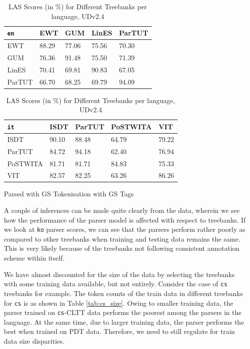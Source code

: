 \begin{table}[H]
    \begin{tabular}{|l|l|l|l|l|}
    \hline
    \verb|en| & EWT & GUM & LinES & ParTUT \\
    \hline
    EWT & 88.29 & 77.06 & 75.56 & 70.30 \\
    \hline
    GUM & 76.36 & 91.48 & 75.50 & 71.39 \\
    \hline
    LinES & 70.41 & 69.81 & 90.83 & 67.05 \\
    \hline 
    ParTUT & 66.70 & 68.25 & 69.79 & 94.09 \\
    \hline 
    \end{tabular}%
    \vspace{5mm}
    \newline
    \begin{tabular}{|l|l|l|l|l|}
    \hline
    \verb|it| & ISDT & ParTUT & PoSTWITA & VIT\\
    \hline
    ISDT & 90.10 & 88.48 & 64.79 & 79.22 \\ 
    \hline
    ParTUT & 84.72 & 94.18 & 62.40 & 76.94 \\
    \hline
    PoSTWITA & 81.71 & 81.71 & 84.83 & 75.33 \\
    \hline
    VIT & 82.57 & 82.25 & 63.26 & 86.26 \\
    \hline
    \end{tabular}%
    
    \caption{LAS Scores (in \%) for Different Treebanks per language, UDv2.4}Parsed with GS Tokenisation with GS Tags
    \label{tab:harmony_las_confusion}
\end{table}

A couple of inferences can be made quite clearly from the data, wherein we see how the performance of the parser model is affected with respect to treebanks. If we look at \verb|ko| parser scores, we can see that the parsers perform rather poorly as compared to other treebanks when training and testing data remains the same. This is very likely because of the treebanks not following consistent annotation scheme within itself.

We have almost discounted for the size of the data by selecting the treebanks with some training data available, but not entirely. Consider the case of \verb|cs| treebanks for example. The token counts of the train data in different treebanks for \verb|cs| is as shown in Table \ref{tab:cs_size}. Owing to smaller training data, the parser trained on \verb|cs|-CLTT data performs the poorest among the parsers in the language. At the same time, due to larger training data, the parser performs the best when trained on PDT data. Therefore, we need to still regulate for train data size disparities.


